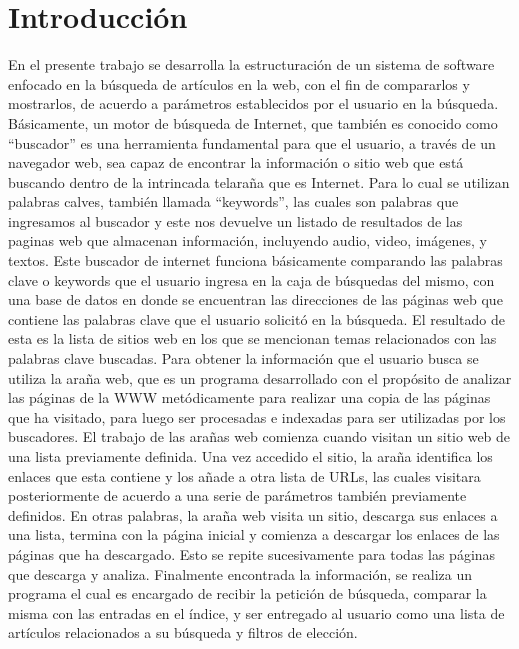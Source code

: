 \section{Introducción}
En el presente trabajo se desarrolla la estructuración de un sistema de software 
enfocado en la búsqueda de artículos en la web, con el fin de compararlos y 
mostrarlos, de acuerdo a parámetros establecidos por el usuario en la búsqueda. 
Básicamente, un motor de búsqueda de Internet, que también es conocido como 
“buscador” es una herramienta fundamental para que el usuario, a través de un 
navegador web, sea capaz de encontrar la información o sitio web que está 
buscando dentro de la intrincada telaraña que es Internet. 
Para lo cual se utilizan palabras calves, también llamada “keywords”, las cuales 
son palabras que ingresamos al buscador y este nos devuelve un listado de 
resultados de las paginas web que almacenan información, incluyendo audio, 
video, imágenes, y textos. 
Este buscador de internet funciona básicamente comparando las palabras clave o 
keywords que el usuario ingresa en la caja de búsquedas del mismo, con una 
base de datos en donde se encuentran las direcciones de las páginas web que 
contiene las palabras clave que el usuario solicitó en la búsqueda. El resultado de 
esta es la lista de sitios web en los que se mencionan temas relacionados con las 
palabras clave buscadas. 
Para obtener la información que el usuario busca se utiliza la araña web, que es 
un programa desarrollado con el propósito de analizar las páginas de la WWW 
metódicamente para realizar una copia de las páginas que ha visitado, para luego 
ser procesadas e indexadas para ser utilizadas por los buscadores. El trabajo de 
las arañas web comienza cuando visitan un sitio web de una lista previamente 
definida. Una vez accedido el sitio, la araña identifica los enlaces que esta 
contiene y los añade a otra lista de URLs, las cuales visitara posteriormente de 
acuerdo a una serie de parámetros también previamente definidos. 
En otras palabras, la araña web visita un sitio, descarga sus enlaces a una lista, 
termina con la página inicial y comienza a descargar los enlaces de las páginas 
que ha descargado. Esto se repite sucesivamente para todas las páginas que 
descarga y analiza. 
Finalmente encontrada la información, se realiza un programa el cual es 
encargado de recibir la petición de búsqueda, comparar la misma con las entradas 
en el índice, y ser entregado al usuario como una lista de artículos relacionados a 
su búsqueda y filtros de elección.